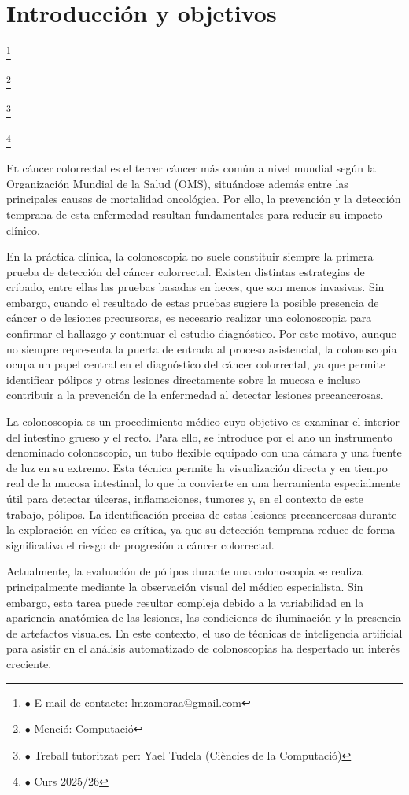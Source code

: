 ﻿\documentclass[10pt,a4paper,twocolumn,twoside]{article}
\newcommand\blfootnote[1]{%
  \begingroup
  \renewcommand\thefootnote{}\footnote{#1}%
  \addtocounter{footnote}{-1}%
  \endgroup
}
\begin{document}
\section{Introducción y objetivos}

\blfootnote{$\bullet$ E-mail de contacte: lmzamoraa@gmail.com}
\blfootnote{$\bullet$ Menció: Computació}
\blfootnote{$\bullet$ Treball tutoritzat per: Yael Tudela (Ciències de la Computació)}
\blfootnote{$\bullet$ Curs 2025/26}

\lettrine[lines=3]{E}{l} cáncer colorrectal es el tercer cáncer más común a nivel mundial según la Organización Mundial de la Salud (OMS)\cite{who_colorectal_2024}, situándose además entre las principales causas de mortalidad oncológica. Por ello, la prevención y la detección temprana de esta enfermedad resultan fundamentales para reducir su impacto clínico.

En la práctica clínica, la colonoscopia no suele constituir siempre la primera prueba de detección del cáncer colorrectal. Existen distintas estrategias de cribado, entre ellas las pruebas basadas en heces, que son menos invasivas\cite{american_cancer_society_colon}. Sin embargo, cuando el resultado de estas pruebas sugiere la posible presencia de cáncer o de lesiones precursoras, es necesario realizar una colonoscopia para confirmar el hallazgo y continuar el estudio diagnóstico. Por este motivo, aunque no siempre representa la puerta de entrada al proceso asistencial, la colonoscopia ocupa un papel central en el diagnóstico del cáncer colorrectal, ya que permite identificar pólipos y otras lesiones directamente sobre la mucosa e incluso contribuir a la prevención de la enfermedad al detectar lesiones precancerosas.

La colonoscopia\cite{mayoclinic_colonoscopia} es un procedimiento médico cuyo objetivo es examinar el interior del intestino grueso y el recto. Para ello, se introduce por el ano un instrumento denominado colonoscopio, un tubo flexible equipado con una cámara y una fuente de luz en su extremo. Esta técnica permite la visualización directa y en tiempo real de la mucosa intestinal, lo que la convierte en una herramienta especialmente útil para detectar úlceras, inflamaciones, tumores y, en el contexto de este trabajo, pólipos. La identificación precisa de estas lesiones precancerosas durante la exploración en vídeo es crítica, ya que su detección temprana reduce de forma significativa el riesgo de progresión a cáncer colorrectal.

Actualmente, la evaluación de pólipos durante una colonoscopia se realiza principalmente mediante la observación visual del médico especialista. Sin embargo, esta tarea puede resultar compleja debido a la variabilidad en la apariencia anatómica de las lesiones, las condiciones de iluminación y la presencia de artefactos visuales. En este contexto, el uso de técnicas de inteligencia artificial para asistir en el análisis automatizado de colonoscopias ha despertado un interés creciente.
\end{document}
